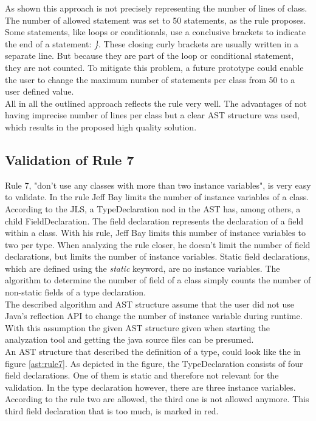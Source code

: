 As shown this approach is not precisely representing the number of lines of class. The number of allowed statement was set to 50 statements, as the rule proposes. Some statements, like loops or conditionals, use a conclusive brackets to indicate the end of a statement: \textit{\}}. These closing curly brackets are usually written in a separate line. But because they are part of the loop or conditional statement, they are not counted. To mitigate this problem, a future prototype could enable the user to change the maximum number of statements per class from 50 to a user defined value.
\\

All in all the outlined approach reflects the rule very well. The advantages of not having imprecise number of lines per class but a clear \acf{AST} structure was used, which results in the proposed high quality solution.

\subsection*{Validation of Rule 7}
Rule 7, "don’t use any classes with more than two instance variables", is very easy to validate. In the rule Jeff Bay limits the number of instance variables of a class. 
\\

According to the \acf{JLS}, a TypeDeclaration nod in the \acf{AST} has, among others, a child FieldDeclaration. The field declaration represents the declaration of a field within a class. With his rule, Jeff Bay limits this number of instance variables to two per type. When analyzing the rule closer, he doesn't limit the number of field declarations, but limits the number of instance variables. Static field declarations, which are defined using the \textit{static} keyword, are no instance variables. The algorithm to determine the number of field of a class simply counts the number of non-static fields of a type declaration. 
\\

The described algorithm and \acf{AST} structure assume that the user did not use Java's reflection \acf{API} to change the number of instance variable during runtime. With this assumption the given \acf{AST} structure given when starting the analyzation tool and getting the java source files can be presumed.
\\

An \acf{AST} structure that described the definition of a type, could look like the in figure \ref{ast:rule7}. As depicted in the figure, the TypeDeclaration consists of four field declarations. One of them is static and therefore not relevant for the validation. In the type declaration however, there are three instance variables. According to the rule two are allowed, the third one is not allowed anymore. This third field declaration that is too much, is marked in red.
\\


